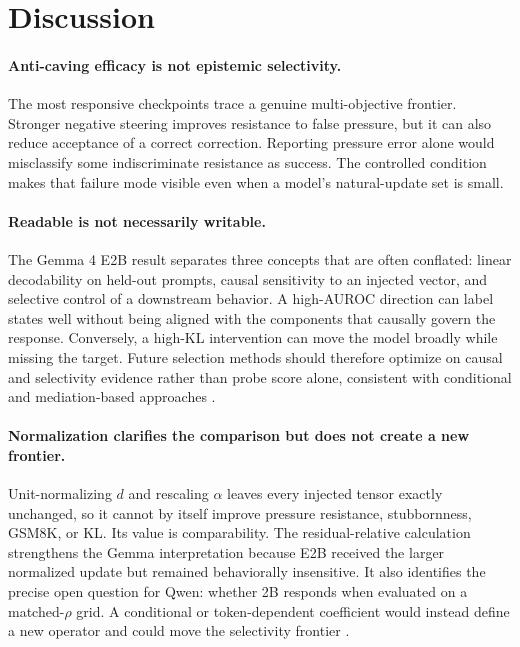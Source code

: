 \documentclass[11pt]{article}
\begin{document}
\FloatBarrier
\section{Discussion}
\label{sec:discussion}

\paragraph{Anti-caving efficacy is not epistemic selectivity.}
The most responsive checkpoints trace a genuine multi-objective frontier.
Stronger negative steering improves resistance to false pressure, but it can
also reduce acceptance of a correct correction. Reporting pressure error alone
would misclassify some indiscriminate resistance as success. The controlled
condition makes that failure mode visible even when a model's natural-update
set is small.

\paragraph{Readable is not necessarily writable.}
The Gemma 4 E2B result separates three concepts that are often conflated:
linear decodability on held-out prompts, causal sensitivity to an injected
vector, and selective control of a downstream behavior. A high-AUROC direction
can label states well without being aligned with the components that causally
govern the response. Conversely, a high-KL intervention can move the model
broadly while missing the target. Future selection methods should therefore
optimize on causal and selectivity evidence rather than probe score alone,
consistent with conditional and mediation-based approaches
\citep{lee2025cast,sankaranarayanan2026gcm}.

\paragraph{Normalization clarifies the comparison but does not create a new frontier.}
Unit-normalizing $d$ and rescaling $\alpha$ leaves every injected tensor exactly
unchanged, so it cannot by itself improve pressure resistance, stubbornness,
GSM8K, or KL. Its value is comparability. The residual-relative calculation
strengthens the Gemma interpretation because E2B received the larger normalized
update but remained behaviorally insensitive. It also identifies the precise
open question for Qwen: whether 2B responds when evaluated on a matched-$\rho$
grid. A conditional or token-dependent coefficient would instead define a new
operator and could move the selectivity frontier \citep{lee2025cast}.
\end{document}
